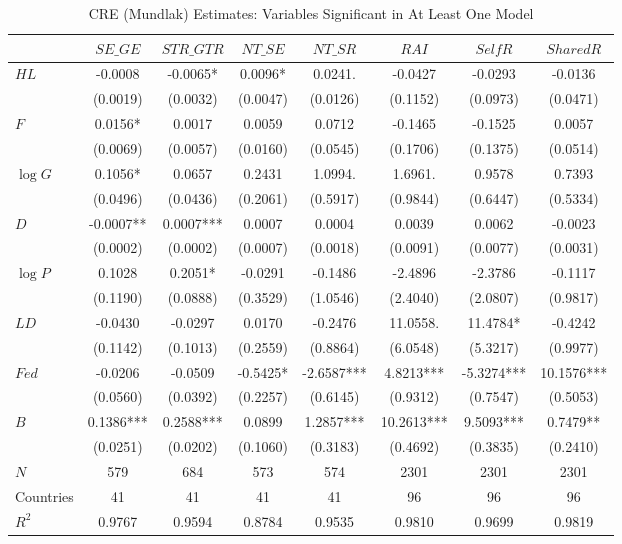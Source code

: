 \begin{table}[!htbp]
\centering
\caption{CRE (Mundlak) Estimates: Variables Significant in At Least One Model}
\label{tab:cre_sig_once}
\scriptsize
\setlength{\tabcolsep}{4pt}
\begin{tabular}{lccccccc}
\hline
 & $SE\_GE$ & $STR\_GTR$ & $NT\_SE$ & $NT\_SR$ & $RAI$ & $SelfR$ & $SharedR$ \\
\hline
$HL$ & -0.0008 & -0.0065* & 0.0096* & 0.0241. & -0.0427 & -0.0293 & -0.0136 \\
 & (0.0019) & (0.0032) & (0.0047) & (0.0126) & (0.1152) & (0.0973) & (0.0471) \\
$F$ & 0.0156* & 0.0017 & 0.0059 & 0.0712 & -0.1465 & -0.1525 & 0.0057 \\
 & (0.0069) & (0.0057) & (0.0160) & (0.0545) & (0.1706) & (0.1375) & (0.0514) \\
$\log G$ & 0.1056* & 0.0657 & 0.2431 & 1.0994. & 1.6961. & 0.9578 & 0.7393 \\
 & (0.0496) & (0.0436) & (0.2061) & (0.5917) & (0.9844) & (0.6447) & (0.5334) \\
$D$ & -0.0007** & 0.0007*** & 0.0007 & 0.0004 & 0.0039 & 0.0062 & -0.0023 \\
 & (0.0002) & (0.0002) & (0.0007) & (0.0018) & (0.0091) & (0.0077) & (0.0031) \\
$\log P$ & 0.1028 & 0.2051* & -0.0291 & -0.1486 & -2.4896 & -2.3786 & -0.1117 \\
 & (0.1190) & (0.0888) & (0.3529) & (1.0546) & (2.4040) & (2.0807) & (0.9817) \\
$LD$ & -0.0430 & -0.0297 & 0.0170 & -0.2476 & 11.0558. & 11.4784* & -0.4242 \\
 & (0.1142) & (0.1013) & (0.2559) & (0.8864) & (6.0548) & (5.3217) & (0.9977) \\
$Fed$ & -0.0206 & -0.0509 & -0.5425* & -2.6587*** & 4.8213*** & -5.3274*** & 10.1576*** \\
 & (0.0560) & (0.0392) & (0.2257) & (0.6145) & (0.9312) & (0.7547) & (0.5053) \\
$B$ & 0.1386*** & 0.2588*** & 0.0899 & 1.2857*** & 10.2613*** & 9.5093*** & 0.7479** \\
 & (0.0251) & (0.0202) & (0.1060) & (0.3183) & (0.4692) & (0.3835) & (0.2410) \\
\hline
$N$ & 579 & 684 & 573 & 574 & 2301 & 2301 & 2301 \\
Countries & 41 & 41 & 41 & 41 & 96 & 96 & 96 \\
$R^2$ & 0.9767 & 0.9594 & 0.8784 & 0.9535 & 0.9810 & 0.9699 & 0.9819 \\

\end{tabular}
\end{table}
